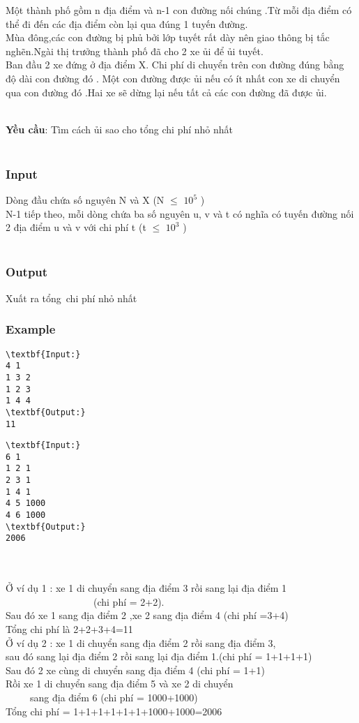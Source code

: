 

Một thành phố gồm n địa điểm và n-1 con đường nối chúng .Từ mỗi địa điểm có thể đi đến các địa điểm còn lại qua đúng 1 tuyến đường.
\\Mùa đông,các con đường bị phủ bởi lớp tuyết rất dày nên giao thông bị tắc nghẽn.Ngài thị trưởng thành phố đã cho 2 xe ủi để ủi tuyết.
\\Ban đầu 2 xe đứng ở địa điểm X. Chi phí di chuyển trên con đường đúng bằng độ dài con đường đó . Một con đường được ủi nếu có ít nhất con xe di chuyển qua con đường đó .Hai xe sẽ dừng lại nếu tất cả các con đường đã được ủi.


\\\textbf{Yều cầu}: Tìm cách ủi sao cho tổng chi phí nhỏ nhất
\\ 

\subsubsection{Input}

Dòng đầu chứa số nguyên N và X (N  $\le$  $10^{5}$ )
\\N-1 tiếp theo, mỗi dòng chứa ba số nguyên u, v và t có nghĩa có tuyến đường nối 2 địa điểm u và v với chi phí t (t  $\le$  $10^{3}$ )
\\ 

\subsubsection{Output}

Xuất ra tổng chi phí nhỏ nhất

\subsubsection{Example}
\begin{verbatim}
\textbf{Input:} 
4 1
1 3 2
1 2 3
1 4 4
\textbf{Output:}
11
\end{verbatim}
\begin{verbatim}
\textbf{Input:} 
6 1
1 2 1
2 3 1
1 4 1
4 5 1000
4 6 1000
\textbf{Output:}
2006\end{verbatim}


\\
\\Ở ví dụ 1 : xe 1 di chuyển sang địa điểm 3 rồi sang lại địa điểm 1
\\                  (chi phí = 2+2).
\\Sau đó xe 1 sang địa điểm 2 ,xe 2 sang địa điểm 4 (chi phí =3+4)
\\Tổng chi phí là 2+2+3+4=11
\\Ở ví dụ 2 : xe 1 di chuyển sang địa điểm 2 rồi sang địa điểm 3,
\\sau đó sang lại địa điểm 2 rồi sang lại địa điểm 1.(chi phí = 1+1+1+1)
\\Sau đó 2 xe cùng di chuyển sang địa điểm 4 (chi phí = 1+1)
\\Rồi xe 1 di chuyển sang địa điểm 5 và xe 2 di chuyển
\\     sang địa điểm 6 (chi phí = 1000+1000)
\\Tổng chi phí = 1+1+1+1+1+1+1000+1000=2006
\\
\\ 

 
